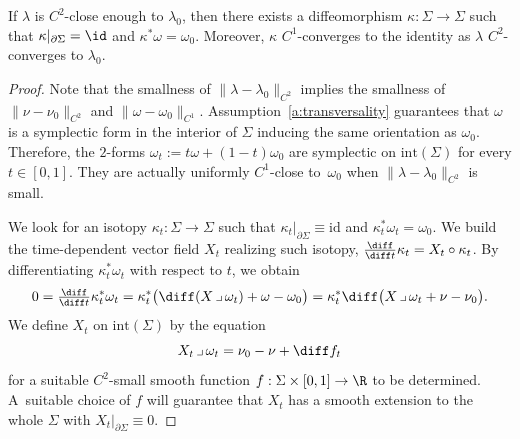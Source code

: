 \begin{lem}
\label{l:pullback_to_nu0}
If $\lambda$ is $C^2$-close enough to $\lambda_0$, then there exists a diffeomorphism $\kappa:\Sigma\to\Sigma$ such that $\kappa|_{\partial\Sigma}=\id$ and $\kappa^*\omega=\omega_0$. Moreover, $\kappa$ $C^1$-converges to the identity as $\lambda$ $C^2$-converges to $\lambda_0$.
\end{lem}

\begin{proof}
Note that the smallness of $\|\lambda-\lambda_0\|_{C^2}$ implies the smallness of $\|\nu-\nu_0\|_{C^2}$ and $\|\omega-\omega_0\|_{C^1}$. Assumption~\ref{a:transversality} guarantees that $\omega$ is a symplectic form in the interior of $\Sigma$ inducing the same orientation as $\omega_0$. Therefore, the $2$-forms $\omega_t:=t\omega+(1-t)\omega_0$ are symplectic on $\mathrm{int}(\Sigma)$ for every $t\in[0,1]$. They are actually uniformly $C^1$-close to~$\omega_0$ when $\|\lambda-\lambda_0\|_{C^2}$ is small.

We look for an isotopy $\kappa_t:\Sigma\to\Sigma$ such that $\kappa_t|_{\partial\Sigma}\equiv\mathrm{id}$ and $\kappa_t^*\omega_t=\omega_0$. We build the time-dependent vector field $X_t$ realizing such isotopy, \ie $\tfrac{\diff}{\diff t}\kappa_t=X_t\circ\kappa_t$. By differentiating $\kappa_t^*\omega_t$ with respect to $t$, we obtain
\begin{equation}
\label{e:X_Moser_0}
0=\tfrac{\diff}{\diff t}\kappa_t^*\omega_t
=
\kappa_t^* \big( \diff(X\,\lrcorner\,\omega_t) + \omega-\omega_0 \big)
=
\kappa_t^* \diff\big(X\,\lrcorner\,\omega_t + \nu-\nu_0 \big) .
\end{equation}
We define $X_t$ on $\mathrm{int}(\Sigma)$ by the equation
\begin{equation}
\label{e:X_Moser}
X_t\,\lrcorner\,\omega_t = \nu_0 - \nu + \diff f_t
\end{equation}
for a suitable $C^2$-small smooth function $f:\Sigma\times [0,1] \to\R$ to be determined. A~suitable choice of $f$ will guarantee that $X_t$ has a smooth extension to the whole $\Sigma$ with $X_t|_{\partial\Sigma}\equiv0$.


\end{proof}
